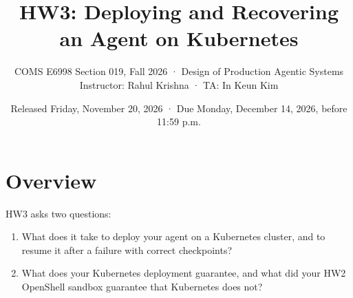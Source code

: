 \documentclass[9pt,letterpaper]{article}
\title{HW3: Deploying and Recovering an Agent on Kubernetes}
\author{COMS E6998 Section 019, Fall 2026 · Design of Production Agentic Systems\\
  Instructor: Rahul Krishna · TA: In Keun Kim}
\date{Released Friday, November 20, 2026 · Due Monday, December 14, 2026, before 11:59 p.m.}
\begin{document}
\makeatletter\markeverypar{\the\everypar}\makeatother
\maketitle

\newcommand\code[1]{\texttt{\detokenize{#1}}}
\newcommand\file{\nolinkurl}

\section{Overview}\label{sec:overview}

HW3 asks two questions:
\begin{enumerate}
\item What does it take to deploy your agent on a Kubernetes cluster, and to
  resume it after a failure with correct checkpoints?
\item What does your Kubernetes deployment guarantee, and what did your HW2
  OpenShell sandbox guarantee that Kubernetes does not?
\end{enumerate}
\end{document}
